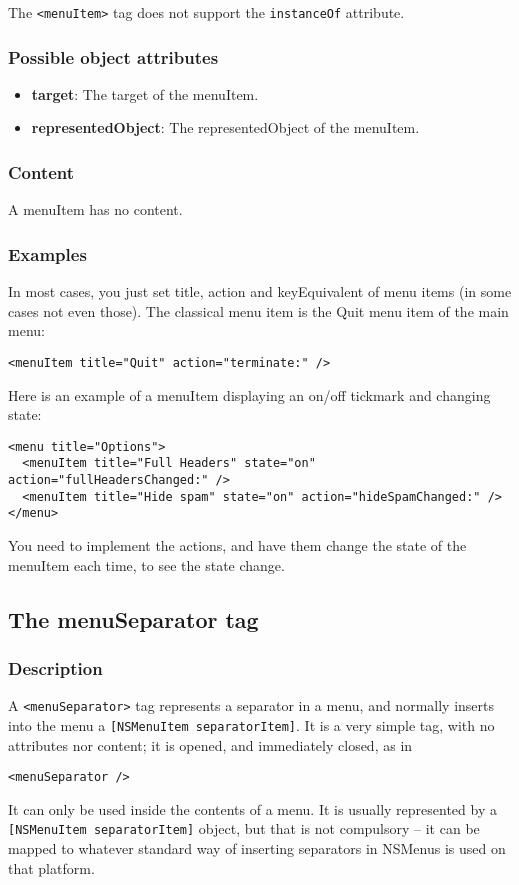 The \texttt{<menuItem>} tag does not support the \texttt{instanceOf} attribute.

\subsubsection{Possible object attributes}
\begin{itemize}
\item {\bf target}: The target of the menuItem.
\item {\bf representedObject}: The representedObject of the menuItem.
\end{itemize}

\subsubsection{Content}
A menuItem has no content.

\subsubsection{Examples}
In most cases, you just set title, action and keyEquivalent of menu items (in
some cases not even those).  The classical menu item is the Quit menu
item of the main menu:
\begin{verbatim}
<menuItem title="Quit" action="terminate:" />
\end{verbatim}
Here is an example of a menuItem displaying an on/off tickmark and
changing state:
\begin{verbatim}
<menu title="Options">
  <menuItem title="Full Headers" state="on" action="fullHeadersChanged:" />
  <menuItem title="Hide spam" state="on" action="hideSpamChanged:" />
</menu>
\end{verbatim}
You need to implement the actions, and have them change the state of the
menuItem each time, to see the state change.

\subsection{The menuSeparator tag}

\subsubsection{Description}
A \texttt{<menuSeparator>} tag represents a separator in a menu, and
normally inserts into the menu a \texttt{[NSMenuItem separatorItem]}.
It is a very simple tag, with no attributes nor content; it is opened,
and immediately closed, as in
\begin{verbatim}
<menuSeparator />
\end{verbatim}
It can only be used inside the contents of a menu.  It is usually
represented by a \texttt{[NSMenuItem separatorItem]} object, but that
is not compulsory -- it can be mapped to whatever standard way of
inserting separators in NSMenus is used on that platform.

